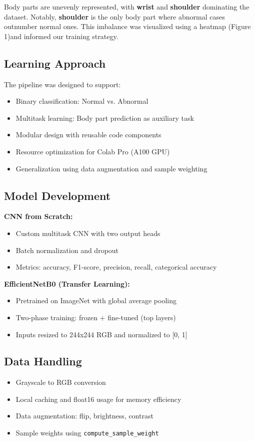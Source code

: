 \documentclass[11pt]{article}
\begin{document}
Body parts are unevenly represented, with \textbf{wrist} and \textbf{shoulder} dominating the dataset. Notably, \textbf{shoulder} is the only body part where abnormal cases outnumber normal ones. This imbalance was visualized using a heatmap (Figure 1)and informed our training strategy.

\subsection*{Learning Approach}
The pipeline was designed to support:
\begin{itemize}
    \item Binary classification: Normal vs. Abnormal
    \item Multitask learning: Body part prediction as auxiliary task
    \item Modular design with reusable code components
    \item Resource optimization for Colab Pro (A100 GPU)
    \item Generalization using data augmentation and sample weighting
\end{itemize}

\subsection*{Model Development}

\textbf{CNN from Scratch:}
\begin{itemize}
    \item Custom multitask CNN with two output heads
    \item Batch normalization and dropout
    \item Metrics: accuracy, F1-score, precision, recall, categorical accuracy
\end{itemize}

\textbf{EfficientNetB0 (Transfer Learning):}
\begin{itemize}
    \item Pretrained on ImageNet with global average pooling
    \item Two-phase training: frozen + fine-tuned (top layers)
    \item Inputs resized to 244x244 RGB and normalized to [0, 1]
\end{itemize}

\subsection*{Data Handling}
\begin{itemize}
    \item Grayscale to RGB conversion
    \item Local caching and float16 usage for memory efficiency
    \item Data augmentation: flip, brightness, contrast
    \item Sample weights using \texttt{compute\_sample\_weight}
\end{itemize}
\end{document}
